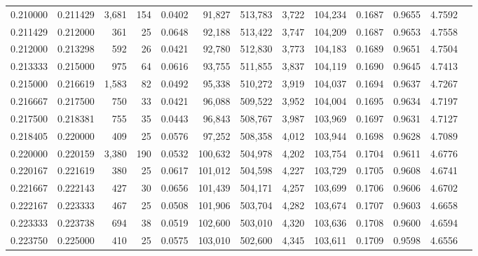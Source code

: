 \begin{tabular}{rrrrrrrrrrrrr}
0.210000 & 0.211429 & 3,681 & 154 &                                     0.0402 &  91,827 & 513,783 &   3,722 & 104,234 & 0.1687 & 0.9655 & 4.7592 \\
0.211429 & 0.212000 &   361 &  25 &                                     0.0648 &  92,188 & 513,422 &   3,747 & 104,209 & 0.1687 & 0.9653 & 4.7558 \\
0.212000 & 0.213298 &   592 &  26 &                                     0.0421 &  92,780 & 512,830 &   3,773 & 104,183 & 0.1689 & 0.9651 & 4.7504 \\
0.213333 & 0.215000 &   975 &  64 &                                     0.0616 &  93,755 & 511,855 &   3,837 & 104,119 & 0.1690 & 0.9645 & 4.7413 \\
0.215000 & 0.216619 & 1,583 &  82 &                                     0.0492 &  95,338 & 510,272 &   3,919 & 104,037 & 0.1694 & 0.9637 & 4.7267 \\
0.216667 & 0.217500 &   750 &  33 &                                     0.0421 &  96,088 & 509,522 &   3,952 & 104,004 & 0.1695 & 0.9634 & 4.7197 \\
0.217500 & 0.218381 &   755 &  35 &                                     0.0443 &  96,843 & 508,767 &   3,987 & 103,969 & 0.1697 & 0.9631 & 4.7127 \\
0.218405 & 0.220000 &   409 &  25 &                                     0.0576 &  97,252 & 508,358 &   4,012 & 103,944 & 0.1698 & 0.9628 & 4.7089 \\
0.220000 & 0.220159 & 3,380 & 190 &                                     0.0532 & 100,632 & 504,978 &   4,202 & 103,754 & 0.1704 & 0.9611 & 4.6776 \\
0.220167 & 0.221619 &   380 &  25 &                                     0.0617 & 101,012 & 504,598 &   4,227 & 103,729 & 0.1705 & 0.9608 & 4.6741 \\
0.221667 & 0.222143 &   427 &  30 &                                     0.0656 & 101,439 & 504,171 &   4,257 & 103,699 & 0.1706 & 0.9606 & 4.6702 \\
0.222167 & 0.223333 &   467 &  25 &                                     0.0508 & 101,906 & 503,704 &   4,282 & 103,674 & 0.1707 & 0.9603 & 4.6658 \\
0.223333 & 0.223738 &   694 &  38 &                                     0.0519 & 102,600 & 503,010 &   4,320 & 103,636 & 0.1708 & 0.9600 & 4.6594 \\
0.223750 & 0.225000 &   410 &  25 &                                     0.0575 & 103,010 & 502,600 &   4,345 & 103,611 & 0.1709 & 0.9598 & 4.6556 \\

\end{tabular}
